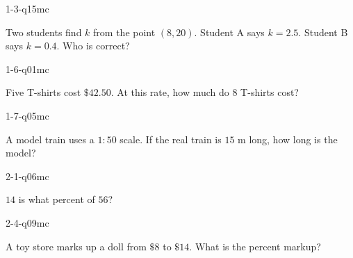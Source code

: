 
\begin{practiceQuestion}{1-3-q15}{mc}
\begin{questionText}
Two students find $k$ from the point $(8, 20)$. Student A says $k = 2.5$. Student B says $k = 0.4$. Who is correct?
\end{questionText}
\end{practiceQuestion}

\begin{practiceQuestion}{1-6-q01}{mc}
\begin{questionText}
Five T-shirts cost $\$42.50$. At this rate, how much do $8$ T-shirts cost?
\end{questionText}
\end{practiceQuestion}

\begin{practiceQuestion}{1-7-q05}{mc}
\begin{questionText}
A model train uses a $1 : 50$ scale. If the real train is $15$ m long, how long is the model?
\end{questionText}
\end{practiceQuestion}

\begin{practiceQuestion}{2-1-q06}{mc}
\begin{questionText}
$14$ is what percent of $56$?
\end{questionText}
\end{practiceQuestion}

\begin{practiceQuestion}{2-4-q09}{mc}
\begin{questionText}
A toy store marks up a doll from $\$8$ to $\$14$. What is the percent markup?
\end{questionText}
\end{practiceQuestion}


